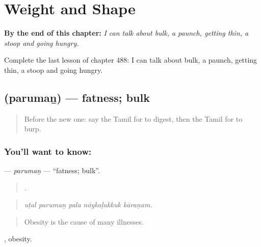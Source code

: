 
\chapter{Weight and Shape}
\label{ch:ta-weight-and-shape}

\begin{chapteropening}
\textbf{By the end of this chapter:} \emph{I can talk about bulk, a paunch, getting thin, a stoop and going hungry.}

Complete the last lesson of chapter 488: I can talk about bulk, a paunch, getting thin, a stoop and going hungry.
\end{chapteropening}

\section[\texorpdfstring{\ta{பருமன்} (parumaṉ)}{பருமன் (parumaṉ)}]{ (parumaṉ) — fatness; bulk}

\label{lesson:TA-C488-paruman}



\begin{quote}
Before the new one: say the Tamil for to digest, then the Tamil for to burp.
\end{quote}

\subsection*{You'll want to know: }
\textbf{} — \emph{parumaṉ} — \textquotedblleft{}fatness; bulk\textquotedblright{}.

\begin{quote}
    .
\end{quote}

\begin{quote}
\emph{uṭal parumaṉ pala nōykaḷukkuk kāraṇam.}
\end{quote}

\begin{quote}
Obesity is the cause of many illnesses.
\end{quote}

 , obesity.

